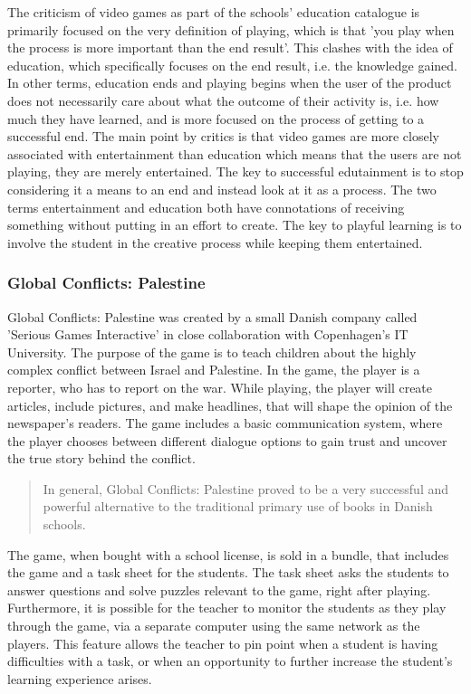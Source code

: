 The criticism of video games as part of the schools' education catalogue is primarily focused on the very definition of playing, which is that 'you play when the process is more important than the end result'. This clashes with the idea of education, which specifically focuses on the end result, i.e. the knowledge gained.
In other terms, education ends and playing begins when the user of the product does not necessarily care about what the outcome of their activity is, i.e. how much they have learned, and is more focused on the process of getting to a successful end.
The main point by critics is that video games are more closely associated with entertainment than education which means that the users are not playing, they are merely entertained.
The key to successful edutainment is to stop considering it a means to an end and instead look at it as a process.
The two terms entertainment and education both have connotations of receiving something without putting in an effort to create. The key to playful learning is to involve the student in the creative process while keeping them entertained.\cite{edunoty}

\subsubsection{Global Conflicts: Palestine}

Global Conflicts: Palestine was created by a small Danish company called 'Serious Games Interactive' in close collaboration with Copenhagen's IT University.
The purpose of the game is to teach children about the highly complex conflict between Israel and Palestine.
In the game, the player is a reporter, who has to report on the war.
While playing, the player will create articles, include pictures, and make headlines, that will shape the opinion of the newspaper's readers.
The game includes a basic communication system, where the player chooses between different dialogue options to gain trust and uncover the true story behind the conflict. 
\begin{quote}
	In general, Global Conflicts: Palestine proved to be a very successful and powerful alternative to the traditional primary use of books in Danish schools.\cite{laeringpaaspil}
\end{quote}
The game, when bought with a school license, is sold in a bundle, that includes the game and a task sheet for the students.
The task sheet asks the students to answer questions and solve puzzles relevant to the game, right after playing.
Furthermore, it is possible for the teacher to monitor the students as they play through the game, via a separate computer using the same network as the players.
This feature allows the teacher to pin point when a student is having difficulties with a task, or when an opportunity to further increase the student's learning experience arises.\newline

